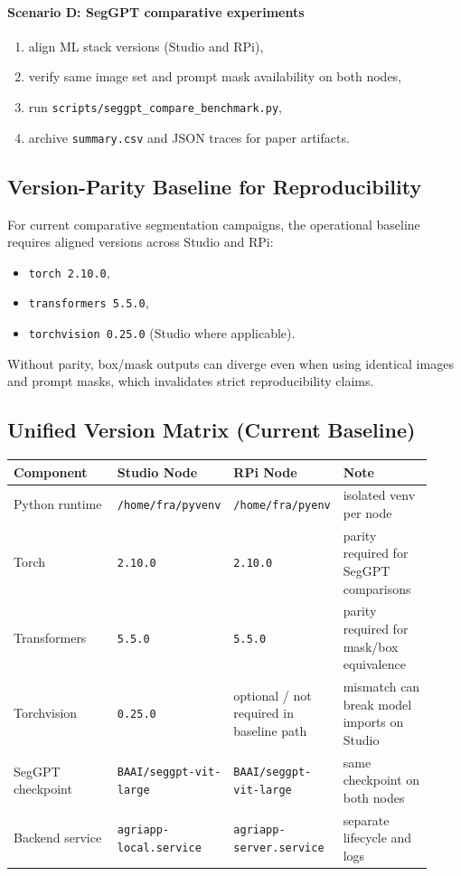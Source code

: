\paragraph{Scenario D: SegGPT comparative experiments}
\begin{enumerate}
  \item align ML stack versions (Studio and RPi),
  \item verify same image set and prompt mask availability on both nodes,
  \item run \texttt{scripts/seggpt\_compare\_benchmark.py},
  \item archive \texttt{summary.csv} and JSON traces for paper artifacts.
\end{enumerate}

\subsection{Version-Parity Baseline for Reproducibility}
For current comparative segmentation campaigns, the operational baseline requires aligned versions across Studio and RPi:
\begin{itemize}
  \item \texttt{torch 2.10.0},
  \item \texttt{transformers 5.5.0},
  \item \texttt{torchvision 0.25.0} (Studio where applicable).
\end{itemize}

Without parity, box/mask outputs can diverge even when using identical images and prompt masks, which invalidates strict reproducibility claims.

\subsection{Unified Version Matrix (Current Baseline)}
\begin{longtable}{p{0.26\linewidth} p{0.22\linewidth} p{0.22\linewidth} p{0.22\linewidth}}
\toprule
Component & Studio Node & RPi Node & Note \\
\midrule
Python runtime & \texttt{/home/fra/pyvenv} & \texttt{/home/fra/pyenv} & isolated venv per node \\
Torch & \texttt{2.10.0} & \texttt{2.10.0} & parity required for SegGPT comparisons \\
Transformers & \texttt{5.5.0} & \texttt{5.5.0} & parity required for mask/box equivalence \\
Torchvision & \texttt{0.25.0} & optional / not required in baseline path & mismatch can break model imports on Studio \\
SegGPT checkpoint & \texttt{BAAI/seggpt-vit-large} & \texttt{BAAI/seggpt-vit-large} & same checkpoint on both nodes \\
Backend service & \texttt{agriapp-local.service} & \texttt{agriapp-server.service} & separate lifecycle and logs \\
\bottomrule
\end{longtable}
